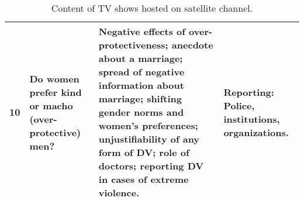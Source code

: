 \begin{table}[H]
{\begin{tabular}{|p{0.5cm}|p{4.5cm}|p{10cm}|p{4.5cm}|}
 10 & Do women prefer kind or macho (over-protective) men? & Negative effects of over-protectiveness; anecdote about a marriage; spread of negative information about marriage; shifting gender norms and women's preferences; unjustifiability of any form of DV; role of doctors; reporting DV in cases of extreme violence. & Reporting: Police, institutions, organizations.\\ [0.5ex] 
 \hline 
\end{tabular}}
\caption{Content of TV shows hosted on satellite channel.}
\label{table:TV_content}
\end{table}